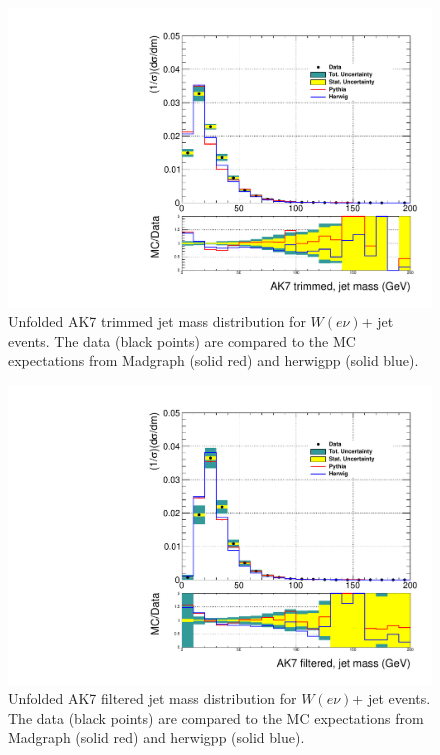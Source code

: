 \begin{figure}[!htb]\centering\includegraphics[width=1.\textwidth]{figs/Wen/jetmassunf_ak7tr_allpT.pdf}
\caption{Unfolded AK7 trimmed jet mass distribution for $W(e\nu)$+ jet events. The data (black points) are compared to the MC expectations from Madgraph (solid red) and herwigpp (solid blue).}
\label{figs:AK7WenInt3}
\end{figure}


\begin{figure}[!htb]\centering\includegraphics[width=1.\textwidth]{figs/Wen/jetmassunf_ak7ft_allpT.pdf}
\caption{Unfolded AK7 filtered jet mass distribution for $W(e\nu)$+ jet events. The data (black points) are compared to the MC expectations from Madgraph (solid red) and herwigpp (solid blue).}
\label{figs:AK7WenInt4}
\end{figure}


